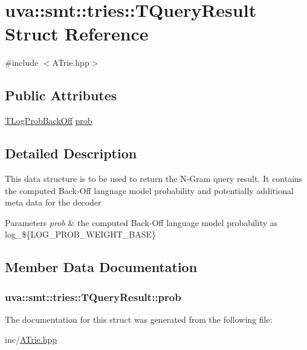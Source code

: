 \hypertarget{structuva_1_1smt_1_1tries_1_1_t_query_result}{}\section{uva\+:\+:smt\+:\+:tries\+:\+:T\+Query\+Result Struct Reference}
\label{structuva_1_1smt_1_1tries_1_1_t_query_result}


{\ttfamily \#include $<$A\+Trie.\+hpp$>$}

\subsection*{Public Attributes}
\begin{DoxyCompactItemize}
\item 
\hyperlink{namespaceuva_1_1smt_1_1tries_acd0660255dd9ef5d644f01de49102750}{T\+Log\+Prob\+Back\+Off} \hyperlink{structuva_1_1smt_1_1tries_1_1_t_query_result_af4096b2afbb3148f8bd0a5e5bcb0abb2}{prob}
\end{DoxyCompactItemize}


\subsection{Detailed Description}
This data structure is to be used to return the N-\/\+Gram query result. It contains the computed Back-\/\+Off language model probability and potentially additional meta data for the decoder 
\begin{DoxyParams}{Parameters}
{\em prob} & the computed Back-\/\+Off language model probability as log\+\_\+\$\{L\+O\+G\+\_\+\+P\+R\+O\+B\+\_\+\+W\+E\+I\+G\+H\+T\+\_\+\+B\+A\+S\+E\} \\
\hline
\end{DoxyParams}


\subsection{Member Data Documentation}
\hypertarget{structuva_1_1smt_1_1tries_1_1_t_query_result_af4096b2afbb3148f8bd0a5e5bcb0abb2}{}
\subsubsection[{prob}]{ uva\+::smt\+::tries\+::\+T\+Query\+Result\+::prob}\label{structuva_1_1smt_1_1tries_1_1_t_query_result_af4096b2afbb3148f8bd0a5e5bcb0abb2}


The documentation for this struct was generated from the following file\+:\begin{DoxyCompactItemize}
\item 
inc/\hyperlink{_a_trie_8hpp}{A\+Trie.\+hpp}\end{DoxyCompactItemize}
